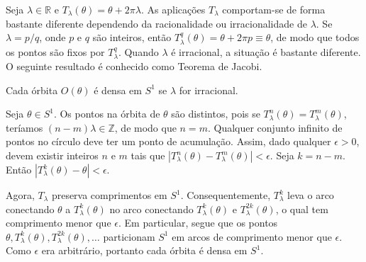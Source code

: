 \documentclass[../IC.tex]{subfiles}
\begin{document}
	\begin{exemplo}
		Seja $\lambda \in \mathbb{R}$ e $T_\lambda(\theta) = \theta + 2\pi\lambda$.
		As aplicações $T_\lambda$ comportam-se de forma bastante diferente dependendo da racionalidade ou irracionalidade de $\lambda$. Se $\lambda = p/q$, onde $p$ e $q$ são inteiros, então $T_\lambda^q(\theta) = \theta + 2\pi p \equiv \theta$, de modo que todos os pontos são fixos por $T_\lambda^q$. Quando $\lambda$ é irracional, a situação é bastante diferente. O seguinte resultado é conhecido como Teorema de Jacobi.
	\end{exemplo}
	
	\begin{teorema}
		Cada órbita $O(\theta)$ é densa em $S^1$ se $\lambda$ for irracional.
	\end{teorema}
	
	\begin{prova}
		Seja $\theta \in S^1$. Os pontos na órbita de $\theta$ são distintos, pois se $T_\lambda^n(\theta) = T_\lambda^m(\theta)$, teríamos $(n - m)\lambda \in \mathbb{Z}$, de modo que $n = m$. Qualquer conjunto infinito de pontos no círculo deve ter um ponto de acumulação. Assim, dado qualquer $\epsilon > 0$, devem existir inteiros $n$ e $m$ tais que $|T_\lambda^n(\theta) - T_\lambda^m(\theta)| < \epsilon$. Seja $k = n - m$. Então $|T_\lambda^k(\theta) - \theta| < \epsilon$.
		
		Agora, $T_\lambda$ preserva comprimentos em $S^1$. Consequentemente, $T_\lambda^k$ leva o arco conectando $\theta$ a $T_\lambda^k(\theta)$ no arco conectando $T_\lambda^k(\theta)$ e $T_\lambda^{2k}(\theta)$, o qual tem comprimento menor que $\epsilon$. Em particular, segue que os pontos $\theta, T_\lambda^k(\theta), T_\lambda^{2k}(\theta), \dots$ particionam $S^1$ em arcos de comprimento menor que $\epsilon$. Como $\epsilon$ era arbitrário, portanto cada órbita é densa em $S^1$.
	\end{prova}
\end{document}
